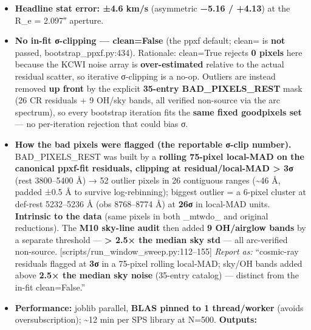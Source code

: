 \documentclass[
]{article}
\newcommand{\BreakablePath}[1]{{\ttfamily\sloppy #1}}
\begin{document}
\begin{itemize}
  \textbf{no separate SPS or degree line is added to the budget (§3.1).}
\item
  \textbf{Headline stat error: ±4.6 km/s} (asymmetric \textbf{−5.16 /
  +4.13}) at the R\_e = 2.097″ aperture.
\item
  \textbf{No in-fit σ-clipping --- \BreakablePath{clean=False}} (the
  ppxf default; \BreakablePath{clean=} is \textbf{not} passed,
  \BreakablePath{bootstrap\_\discretionary{}{}{}ppxf.\discretionary{}{}{}py:434}).
  Rationale: \BreakablePath{clean=True} rejects \textbf{0 pixels} here
  because the KCWI noise array is \textbf{over-estimated} relative to
  the actual residual scatter, so iterative σ-clipping is a no-op.
  Outliers are instead removed \textbf{up front} by the explicit
  \textbf{35-entry
  \BreakablePath{BAD\_\discretionary{}{}{}PIXELS\_\discretionary{}{}{}REST}}
  mask (26 CR residuals + 9 OH/sky bands, all verified non-source via
  the arc spectrum), so every bootstrap iteration fits the \textbf{same
  fixed \BreakablePath{goodpixels} set} --- no per-iteration rejection
  that could bias σ.
\item
  \textbf{How the bad pixels were flagged (the reportable σ-clip
  number).}
  \BreakablePath{BAD\_\discretionary{}{}{}PIXELS\_\discretionary{}{}{}REST}
  was built by a \textbf{rolling 75-pixel local-MAD on the canonical
  ppxf-fit residuals, clipping at \textbar residual\textbar/local-MAD
  \textgreater{} 3σ} (rest 3800--5400 Å) → 52 outlier pixels in 26
  contiguous ranges (\textasciitilde46 Å, padded ±0.5 Å to survive
  log-rebinning); biggest outlier = a 6-pixel cluster at def-rest
  5232--5236 Å (obs 8768--8774 Å) at \textbf{26σ} in local-MAD units.
  \textbf{Intrinsic to the data} (same pixels in both
  \BreakablePath{\_\discretionary{}{}{}mtwdo\_\discretionary{}{}{}} and
  original reductions). The \textbf{M10 sky-line audit} then added
  \textbf{9 OH/airglow bands} by a separate threshold ---
  \textbf{\textgreater{} 2.5× the median sky std} --- all arc-verified
  non-source.
  {[}\BreakablePath{scripts/\discretionary{}{}{}run\_\discretionary{}{}{}window\_\discretionary{}{}{}sweep.\discretionary{}{}{}py:112–155}{]}
  \emph{Report as:} ``cosmic-ray residuals flagged at \textbf{3σ} in a
  75-pixel rolling local-MAD; sky/OH bands added above \textbf{2.5× the
  median sky noise} (35-entry catalog) --- distinct from the in-fit
  \BreakablePath{clean=False}.''
\item
  \textbf{Performance:} \BreakablePath{joblib} parallel, \textbf{BLAS
  pinned to 1 thread/worker} (avoids oversubscription);
  \textasciitilde12 min per SPS library at N=500. \textbf{Outputs:}

\end{itemize}
\end{document}
